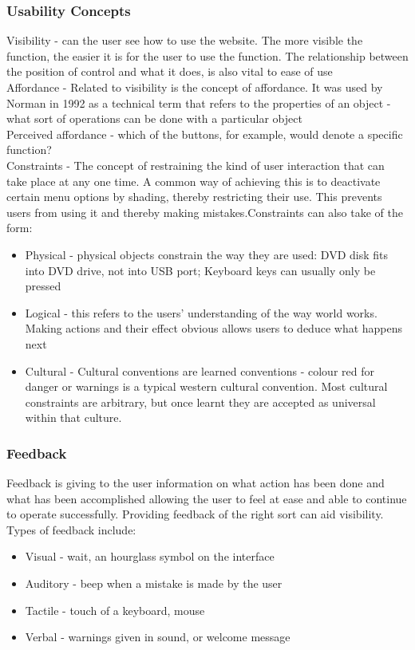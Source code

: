 \documentclass[a4paper]{article}
\theoremstyle{plain}
\theoremstyle{definition}
\theoremstyle{remark}
\begin{document}
\begin{flushleft}
\subsubsection{Usability Concepts}
Visibility - can the user see how to use the website. The more visible the function, the easier it is for the user to use the function. The relationship between the position of control and what it does, is also vital to ease of use \\
Affordance - Related to visibility is the concept of affordance. It was used by Norman in 1992 as a technical term that refers to the properties of an object - what sort of operations can be done with a particular object\\
Perceived affordance - which of the buttons, for example, would denote a specific function?\\
Constraints - The concept of restraining the kind of user interaction that can take place at any one time. A common way of achieving this is to deactivate certain menu options by shading, thereby restricting their use. This prevents users from using it and thereby making mistakes.Constraints can also take of the form:
\begin{itemize}
	\item Physical - physical objects constrain the way they are used: DVD disk fits into DVD drive, not into USB port; Keyboard keys can usually only be pressed
	\item Logical - this refers to the users' understanding of the way world works. Making actions and their effect obvious allows users to deduce what happens next
	\item Cultural - Cultural conventions are learned conventions - colour red for danger or warnings is a typical western cultural convention. Most cultural constraints are arbitrary, but once learnt they are accepted as universal within that culture.
\end{itemize}
\subsubsection{Feedback}
Feedback is giving to the user information on what action has been done and what has been accomplished allowing the user to feel at ease and able to continue to operate successfully. Providing feedback of the right sort can aid visibility. Types of feedback include:
\begin{itemize}
	\item Visual - wait, an hourglass symbol on the interface
	\item Auditory - beep when a mistake is made by the user
	\item Tactile - touch of a keyboard, mouse
	\item Verbal - warnings given in sound, or welcome message
\end{itemize}

\end{flushleft}
\end{document}
